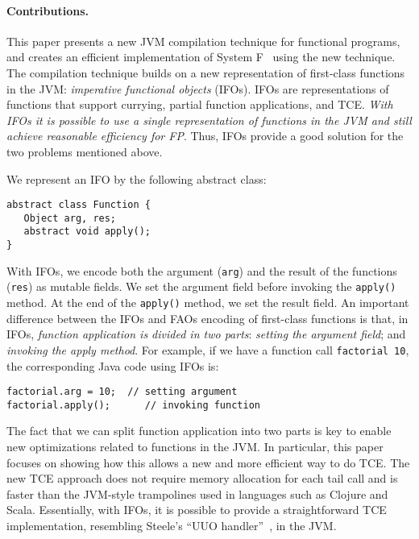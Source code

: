 \paragraph{Contributions.} 
This paper presents a new JVM compilation technique for
functional programs, and creates an efficient implementation of System
F~\cite{girard72dissertation,reynolds74towards} using the new
technique. The compilation technique builds on a new representation of
first-class functions in the JVM: \emph{imperative functional
  objects} (IFOs). IFOs are representations of
functions that support currying, partial function applications, and TCE. 
\emph{With IFOs it is possible to use a single
 representation of functions in the JVM and still achieve reasonable
efficiency for FP}. Thus, IFOs provide a good solution for the two problems
mentioned above.

We represent an IFO by the following abstract class:

\begin{lstlisting}
abstract class Function { 
   Object arg, res;
   abstract void apply();
}
\end{lstlisting}

\noindent With IFOs, we encode both the argument
(\lstinline{arg}) and the result of the functions (\lstinline{res})
as mutable fields. 
We set the argument field before
invoking the \lstinline{apply()} method. At the end of the \lstinline{apply()} method, we set  the result field. 
An important difference between the IFOs and FAOs encoding of 
first-class functions is that, in IFOs, \emph{function application is
divided in two parts}: \emph{setting the argument field}; and \emph{invoking the
apply method}.
For example, if we have a function call
\lstinline{factorial 10}, the corresponding Java code using IFOs
is:

\begin{lstlisting}
factorial.arg = 10;  // setting argument
factorial.apply();      // invoking function
\end{lstlisting} 

The fact that we can split function application into two parts is key
to enable new optimizations related to functions
in the JVM. In particular, this paper focuses on showing how this
allows a new and more efficient way to do TCE. The new TCE
approach does not require memory allocation for each tail
call and is faster than the JVM-style trampolines used in languages
such as Clojure and Scala. Essentially, with IFOs, it is possible to
provide a straightforward TCE implementation, resembling Steele's ``UUO
handler''~\cite{Steele1978}, in the JVM.
 
